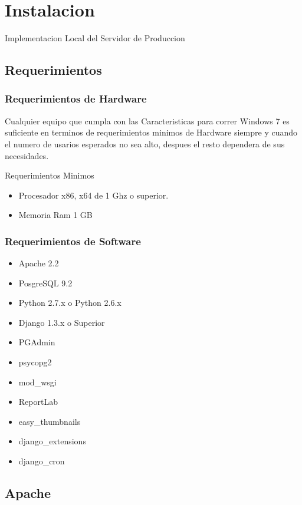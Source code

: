 \chapter{Instalacion}

Implementacion Local del Servidor de Produccion

\section{Requerimientos}

\subsection{Requerimientos de Hardware}

Cualquier equipo que cumpla con las Caracteristicas para correr Windows 7 es suficiente
en terminos de requerimientos minimos de Hardware siempre y cuando el numero de usarios
esperados no sea alto, despues el resto dependera de sus necesidades.

\large Requerimientos Minimos

\begin{itemize}
    \item Procesador x86, x64 de 1 Ghz o superior.
    \item Memoria Ram 1 GB
\end{itemize}


\subsection{Requerimientos de Software}


\begin{itemize}
    \item Apache 2.2
    \item PosgreSQL 9.2
    \item Python 2.7.x o Python 2.6.x
    \item Django 1.3.x o Superior
    \item PGAdmin
    \item psycopg2
    \item mod\_wsgi
    \item ReportLab
    \item easy\_thumbnails
    \item django\_extensions
    \item django\_cron
\end{itemize}


\section{Apache}


